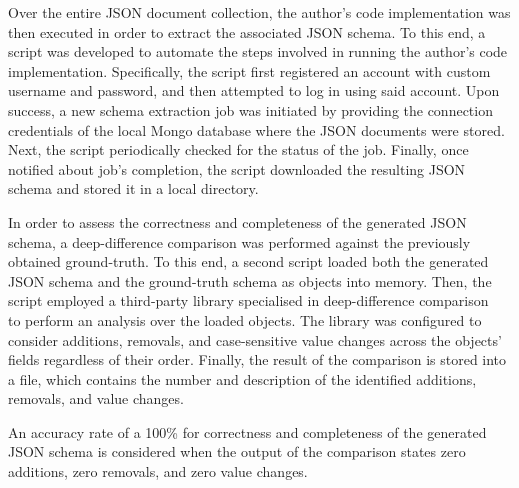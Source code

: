 \documentclass[sigconf, nonacm]{acmart}
\begin{document}

Over the entire JSON document collection, the author's code implementation was then executed in order to extract the associated JSON schema. To this end, a script was developed to automate the steps involved in running the author's code implementation. Specifically, the script first registered an account with custom username and password, and then attempted to log in using said account. Upon success, a new schema extraction job was initiated by providing the connection credentials of the local Mongo database where the JSON documents were stored. Next, the script periodically checked for the status of the job. Finally, once notified about job's completion, the script downloaded the resulting JSON schema and stored it in a local directory.

In order to assess the correctness and completeness of the generated JSON schema, a deep-difference comparison was performed against the previously obtained ground-truth. To this end, a second script loaded both the generated JSON schema and the ground-truth schema as objects into memory. Then, the script employed a third-party library specialised in deep-difference comparison~\cite{deepdiff} to perform an analysis over the loaded objects. The library was configured to consider additions, removals, and case-sensitive value changes across the objects' fields regardless of their order. Finally, the result of the comparison is stored into a file, which contains the number and description of the identified additions, removals, and value changes.

An accuracy rate of a 100\% for correctness and completeness of the generated JSON schema is considered when the output of the comparison states zero additions, zero removals, and zero value changes.
\end{document}
